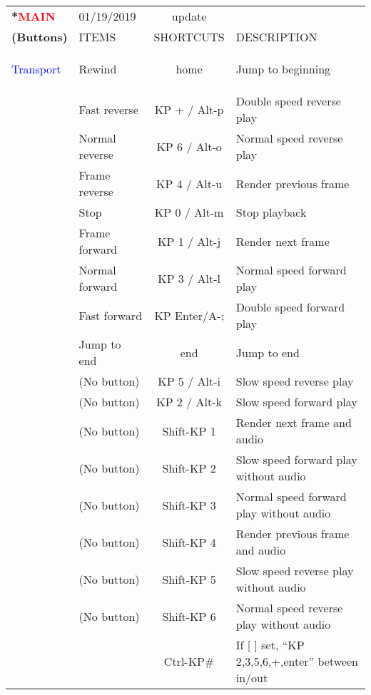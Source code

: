 \begin{center}
    \small 
    \begin{longtable}{ >{\bfseries}p{2cm} l c p{6cm}}             
        \toprule
        \multirow{2}*{\textcolor{red}{MAIN}} & 01/19/2019 & update & \\
        \noalign{\smallskip}
        \cline{2-4}
        \noalign{\smallskip}
        (Buttons) & ITEMS & SHORTCUTS & DESCRIPTION\\        
        \midrule
        \endhead        
        
        \textcolor{blue}{Transport} & Rewind & home & Jump to beginning \\        
        & Fast reverse & KP + / Alt-p & Double speed reverse play \\        
        & Normal reverse & KP 6 / Alt-o & Normal speed reverse play \\        
        & Frame reverse & KP 4 / Alt-u & Render previous frame \\        
        & Stop & KP 0 / Alt-m & Stop playback \\        
        & Frame forward & KP 1 / Alt-j & Render next frame \\        
        & Normal forward & KP 3 / Alt-l & Normal speed forward play \\        
        & Fast forward & KP Enter/A-; & Double speed forward play \\        
        & Jump to end & end & Jump to end \\        
        & (No button) & KP 5 / Alt-i & Slow speed reverse play \\        
        & (No button) & KP 2 / Alt-k & Slow speed forward play \\        
        & (No button) & Shift-KP 1 & Render next frame and audio \\        
        & (No button) & Shift-KP 2 & Slow speed forward play without audio \\        
        & (No button) & Shift-KP 3 & Normal speed forward play without audio \\        
        & (No button) & Shift-KP 4 & Render previous frame and audio \\        
        & (No button) & Shift-KP 5 & Slow speed reverse play without audio \\        
        & (No button) & Shift-KP 6 & Normal speed reverse play without audio \\        
        &  & Ctrl-KP\# & If [ ] set, “KP 2,3,5,6,+,enter” between in/out \\        

\end{longtable}
\end{center}
